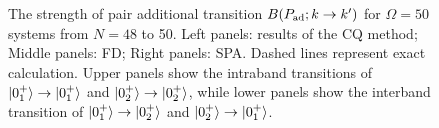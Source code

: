 \documentclass[%
superscriptaddress,
preprint,
showpacs,
nofootinbib,
amsmath,amssymb,
aps,
prc,
floatfix ]%
{revtex4-1}
\begin{document}
\begin{figure}[t]
\begin{minipage}{0.3\hsize}
\begin{center}
 \end{center}
 \captionsetup{labelformat=empty,labelsep=none}
 \end{minipage}
 \caption{The strength of pair additional transition
$B(P_{\rm ad};k\rightarrow k')$ for $\Omega=50$ systems
from $N=48$ to 50.
Left panels: results of the CQ method; Middle panels: FD; Right panels: SPA.
Dashed lines represent exact calculation.
Upper panels show the intraband transitions of
$\ket{0_1^+}\to\ket{0_1^+}$ and $\ket{0_2^+}\to\ket{0_2^+}$,
while lower panels show the interband transition of
$\ket{0_1^+}\to\ket{0_2^+}$ and $\ket{0_2^+}\to\ket{0_1^+}$.
}
 \label{fig:N50Pad}
\end{figure}


\end{document}
